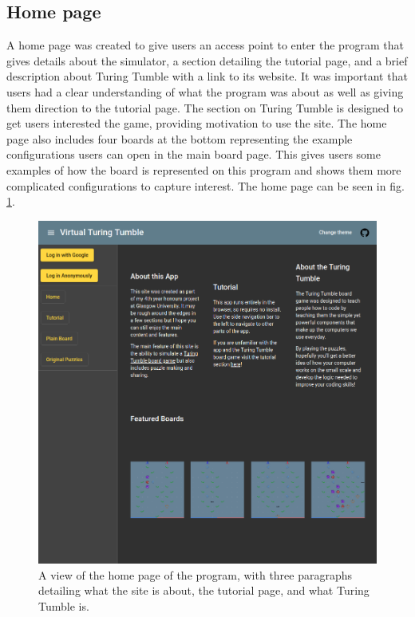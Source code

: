 \documentclass{l4proj}
\begin{document}
\subsection{Home page}
A home page was created to give users an access point to enter the program that gives details about the simulator, a section detailing the tutorial page, and a brief description about Turing Tumble with a link to its website. It was important that users had a clear understanding of what the program was about as well as giving them direction to the tutorial page. The section on Turing Tumble is designed to get users interested the game, providing motivation to use the site. The home page also includes four boards at the bottom representing the example configurations users can open in the main board page. This gives users some examples of how the board is represented on this program and shows them more complicated configurations to capture interest. The home page can be seen in fig. \ref{fig:homePage}.

\begin{figure}
    \centering
    \includegraphics[width=0.65\linewidth]{images/darkTheme.png}
    \caption{A view of the home page of the program, with three paragraphs detailing what the site is about, the tutorial page, and what Turing Tumble is.}
    \label{fig:homePage}
\end{figure}
\end{document}
